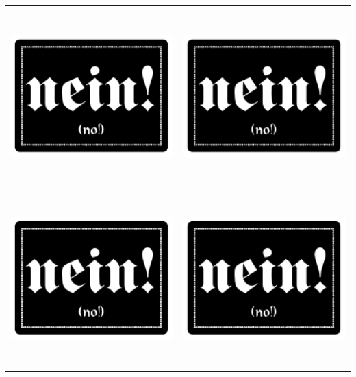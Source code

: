 \documentclass[12pt,a4paper,spanish]{article}
\begin{document}
	\newpage
	
	\begin{table}
		\centering
		\begin{tabular}{|c|c|}
			\toprule
			\includegraphics[height=6.74cm]{./Drawings/nein!.pdf} &
			\includegraphics[height=6.74cm]{./Drawings/nein!.pdf} \\
			\midrule
			\includegraphics[height=6.74cm]{./Drawings/nein!.pdf} &
			\includegraphics[height=6.74cm]{./Drawings/nein!.pdf} \\

\end{tabular}
\end{table}
\end{document}
